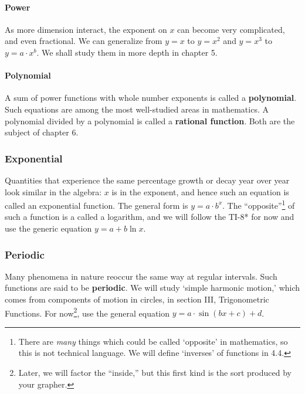 \paragraph{Power}
As more dimension interact, the exponent on $x$ can become very 
complicated, and even fractional.  We can generalize
from $y=x$ to $y=x^2$ and $y=x^3$ to $y=a\cdot x^b$.  We shall study them in more depth
in chapter 5.

\paragraph{Polynomial}
A sum of power functions with whole number exponents is called a
\textbf{polynomial}.  Such equations are among the most well-studied
areas in mathematics.  A polynomial divided by a polynomial is called
a \textbf{rational function}.  Both are the subject of chapter 6.

\subsubsection{Exponential}
Quantities that experience the same percentage growth or decay 
year over year look similar in the algebra: $x$ is in
the exponent, and hence such an equation is called an \gls{exponential} function.  The general form
is $y=a\cdot b^x$.  
The ``opposite''\footnote{There are \emph{many} things 
which could be called `opposite'
in mathematics, so this is not technical language.  We will define `inverses' of functions in 4.4.} of such a 
function is a called a \gls{logarithm}, and we will follow the TI-8* for now and use the generic equation
$y=a+b\ln{x}$.  

\subsubsection{Periodic}
Many phenomena in nature reoccur the same way at regular intervals.  
Such functions are said to be \textbf{periodic}.
We will  study `simple harmonic motion,' which comes from components of motion in circles, in section III,
Trigonometric Functions.  For now\footnote{Later, we
will factor the ``inside,'' but this first kind is the sort produced by your grapher.}, use the general equation $y=a\cdot\sin(bx+c)+d$.

